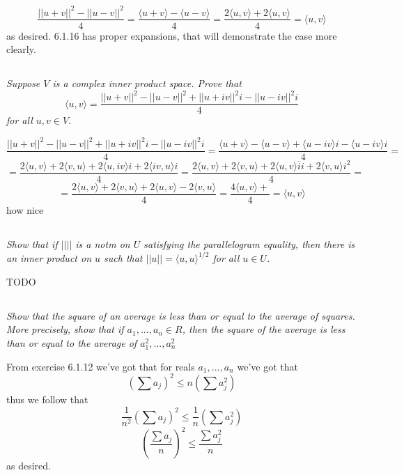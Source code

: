 \documentclass[11pt,oneside,titlepage]{book}
\newcommand{\eangle}[1]{\langle #1 \rangle}
\begin{document}
$$\frac{|| u + v||^2 - ||u - v||^2 }{4} = \frac{\eangle{u + v} - \eangle{u - v}}{4} =
\frac{2\eangle{u, v} + 2\eangle{u, v}}{4} = \eangle{u, v}$$
as desired. 6.1.16 has proper expansions, that will demonstrate the case more clearly.


\subsection{}

\textit{Suppose $V$ is a complex inner product space. Prove that }
$$\eangle{u, v} = \frac{|| u + v||^2 - ||u - v||^2 + || u + iv||^2i - ||u - iv||^2i }{4}$$
\textit{for all $u, v \in V$.}

$$\frac{|| u + v||^2 - ||u - v||^2 + || u + iv||^2i - ||u - iv||^2i }{4} =
\frac{\eangle{u + v} - \eangle{u - v} + \eangle{u - iv}i - \eangle{u - iv}i }{4} = $$
$$ = \frac{2 \eangle{u, v} + 2\eangle{v, u} + 2 \eangle{u, iv} i + 2\eangle{iv, u} i  }{4} =
\frac{2 \eangle{u, v} + 2\eangle{v, u} +
  2 \eangle{u, v} \overline{i}  i + 2\eangle{v, u} i^2  }{4} = $$
$$ = \frac{2 \eangle{u, v} + 2\eangle{v, u} +
  2 \eangle{u, v}  - 2\eangle{v, u}   }{4}  = \frac{4 \eangle{u, v} +  }{4} =  \eangle{u, v} $$
how nice

\subsection{}

\textit{Show that if $||||$ is a notm on $U$ satisfying the parallelogram equality, then there
  is an inner product on $u$ such that $||u|| = \eangle{u, u}^{1/2}$ for all $u \in U$.}

TODO

\subsection{}

\textit{Show that the square of an average is less than or equal to the average of squares. More
  precisely, show that if $a_1, ..., a_n \in R$, then the square of the average is less than or
  equal to the average of $a_1^2, ..., a_n^2$}

From exercise 6.1.12 we've got that for reals $a_1, ..., a_n$ we've got that
$$(\sum{a_j})^2 \leq n \left(\sum{a_j^2}\right)$$
thus we follow that
$$\frac{1}{n^2}(\sum{a_j})^2 \leq \frac{1}{n} \left(\sum{a_j^2}\right)$$
$$\left(\frac{\sum{a_j}}{n}\right)^2 \leq \frac{\sum{a_j^2}}{n} $$
as desired.

\subsection{}
\end{document}
